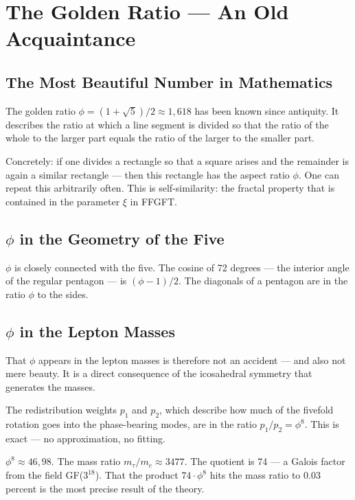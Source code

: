 \documentclass[12pt,oneside]{book}
\begin{document}
\chapter{The Golden Ratio --- An Old Acquaintance}

\section{The Most Beautiful Number in Mathematics}

The golden ratio $\phi = (1 + \sqrt{5})/2 \approx 1{,}618$ has been known since antiquity. It describes the ratio at which a line segment is divided so that the ratio of the whole to the larger part equals the ratio of the larger to the smaller part.

Concretely: if one divides a rectangle so that a square arises and the remainder is again a similar rectangle --- then this rectangle has the aspect ratio $\phi$. One can repeat this arbitrarily often. This is self-simi\-larity: the fractal property that is contained in the parameter $\xi$ in FFGFT.

\section{$\phi$ in the Geometry of the Five}

$\phi$ is closely connected with the five. The cosine of 72 degrees --- the interior angle of the regular pentagon --- is $(\phi - 1)/2$. The diagonals of a pentagon are in the ratio $\phi$ to the sides.

\section{$\phi$ in the Lepton Masses}

That $\phi$ appears in the lepton masses is therefore not an accident --- and also not mere beauty. It is a direct consequence of the icosahedral symmetry that generates the masses.

The redistribution weights $p_1$ and $p_2$, which describe how much of the fivefold rotation goes into the phase-bearing modes, are in the ratio $p_1/p_2 = \phi^8$. This is exact --- no approximation, no fitting.

$\phi^8 \approx 46{,}98$. The mass ratio $m_\tau / m_e \approx 3477$. The quotient is 74 --- a Galois factor from the field GF($3^{18}$). That the product $74 \cdot \phi^8$ hits the mass ratio to 0.03 percent is the most precise result of the theory.
\end{document}
